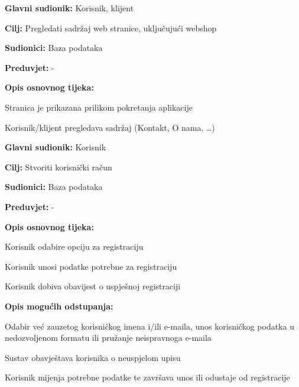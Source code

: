 				
				\noindent {}
				\begin{packed_item}
					
					\item \textbf{Glavni sudionik: } Korisnik, klijent
					\item  \textbf{Cilj:} Pregledati sadržaj web stranice, uključujući webshop
					\item  \textbf{Sudionici:} Baza podataka
					\item  \textbf{Preduvjet:}  - 
					\item  \textbf{Opis osnovnog tijeka:}
					
					\item[] \begin{packed_enum}
						\item Stranica je prikazana prilikom pokretanja aplikacije
						\item Korisnik/klijent pregledava sadržaj (Kontakt, O nama, …) 
					\end{packed_enum}
				\end{packed_item}
				
				\noindent \underbar{\textbf{UC2: Registracija}}
				\begin{packed_item}
					
					\item \textbf{Glavni sudionik: } Korisnik
					\item  \textbf{Cilj:} Stvoriti korisnički račun
					\item  \textbf{Sudionici:} Baza podataka
					\item  \textbf{Preduvjet:} - 
					\item  \textbf{Opis osnovnog tijeka:}
					
					\item[] \begin{packed_enum}
						\item Korisnik odabire opciju za registraciju
						\item Korisnik unosi podatke potrebne za registraciju
						\item Korisnik dobiva obavijest o uspješnoj registraciji
					\end{packed_enum}
					\item  \textbf{Opis mogućih odstupanja:}
					\item[] \begin{packed_item}
						
						
						
						\item[2.a]      Odabir već zauzetog korisničkog imena i/ili e-maila, unos korisničkog podatka u nedozvoljenom formatu ili pružanje neispravnoga e-maila
						\item[] \begin{packed_enum}
							\item         Sustav obavještava korisnika o neuspjelom upisu
							\item         Korisnik mijenja potrebne podatke te završava unos ili odustaje od registracije
						\end{packed_enum}
					\end{packed_item}
				\end{packed_item}
				
